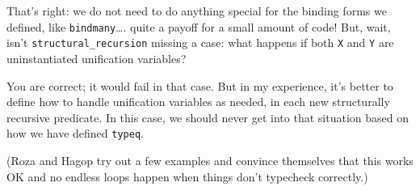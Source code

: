 \heroSTUDENT{} That's right: we do not need to do anything special for the
binding forms we defined, like \texttt{bindmany}\ldots{}. quite a payoff
for a small amount of code! But, wait, isn't
\texttt{structural\_recursion} missing a case: what happens if both
\texttt{X} and \texttt{Y} are uninstantiated unification variables?

\heroADVISOR{} You are correct; it would fail in that case. But in my
experience, it's better to define how to handle unification variables as
needed, in each new structurally recursive predicate. In this case, we
should never get into that situation based on how we have defined
\texttt{typeq}.

\begin{scenecomment}
(Roza and Hagop try out a few examples and convince themselves that this works OK and no endless loops happen when things don't typecheck correctly.)
\end{scenecomment}
